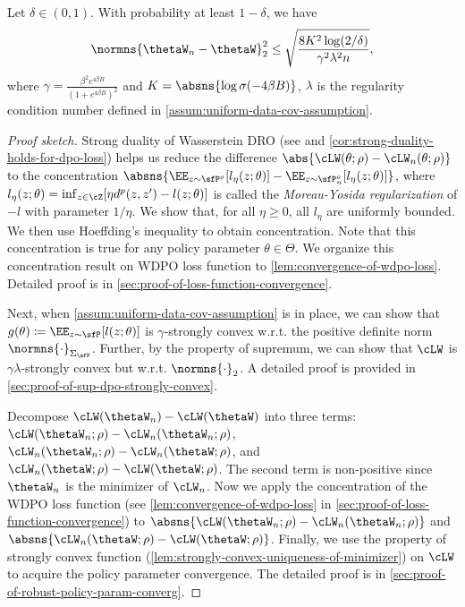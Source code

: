 \begin{theorem}\label{thm:wdpo-policy-parameter-convergence}
    Let $\delta\in(0,1)$. With probability at least $1-\delta$, we have
    \begin{equation*}
        \normns{\thetaW_n-\thetaW}^2_2 \leq \sqrt{\frac{8K^2\log(2/\delta)}{\gamma^2\lambda^2 n}},
    \end{equation*}
    where $\gamma=\frac{\beta^2e^{4\beta B}}{(1+e^{4\beta B})^2}$ and $K=\absns{\log\sigma(-4\beta B)}$, $\lambda$ is the regularity condition number defined in \cref{assum:uniform-data-cov-assumption}.
\end{theorem}
\begin{proof}[Proof sketch]
    Strong duality of Wasserstein DRO (see \citet{gao-2022-distributionally} and \cref{cor:strong-duality-holds-for-dpo-loss}) helps us  reduce the difference $\abs{\cLW(\theta;\rho)-\cLW_n(\theta;\rho)}$ to the concentration $\absns{\EE_{z\sim \sfP^o}[l_\eta(z;\theta)] - \EE_{z\sim \sfP^o_n}[l_\eta(z;\theta)]}$, where $l_\eta(z;\theta)=\inf_{z\in\cZ} [\eta d^p(z,z') - l(z;\theta)]$ is called the \textit{Moreau-Yosida regularization} of $-l$ with parameter $1/\eta$. We show that, for all $\eta\geq 0$, all $l_\eta$ are uniformly bounded. We then use Hoeffding's inequality to obtain concentration. Note that this concentration is true for any policy parameter $\theta\in\Theta$. We organize this concentration result on WDPO loss function to \cref{lem:convergence-of-wdpo-loss}. Detailed proof is in \cref{sec:proof-of-loss-function-convergence}.

    Next, when \cref{assum:uniform-data-cov-assumption} is in place, we can show that $g(\theta)\coloneqq \EE_{z\sim\sfP}[l(z;\theta)]$ is $\gamma$-strongly convex w.r.t. the positive definite norm $\normns{\cdot}_{\Sigma_{\sfP}}$. Further, by the property of supremum, we can show that $\cLW$ is $\gamma\lambda$-strongly convex but w.r.t. $\normns{\cdot}_{2}$. A detailed proof is provided in \cref{sec:proof-of-sup-dpo-strongly-convex}.
    
    Decompose $\cLW(\thetaW_n)-\cLW(\thetaW)$ into three terms: $\cLW(\thetaW_n;\rho)-\cLW_n(\thetaW_n;\rho)$, $\cLW_n(\thetaW_n;\rho)-\cLW_n(\thetaW;\rho)$, and $\cLW_n(\thetaW;\rho)-\cLW(\thetaW;\rho)$. The second term is non-positive since $\thetaW_n$ is the minimizer of $\cLW_n$. Now we apply the concentration of the WDPO loss function (see \cref{lem:convergence-of-wdpo-loss} in \cref{sec:proof-of-loss-function-convergence}) to $\absns{\cLW(\thetaW_n;\rho)-\cLW_n(\thetaW_n;\rho)}$ and $\absns{\cLW_n(\thetaW;\rho)-\cLW(\thetaW;\rho)}$. Finally, we use the property of strongly convex function (\cref{lem:strongly-convex-uniqueness-of-minimizer}) on $\cLW$ to acquire the policy parameter convergence. The detailed proof is in \cref{sec:proof-of-robust-policy-param-converg}. 
\end{proof}

